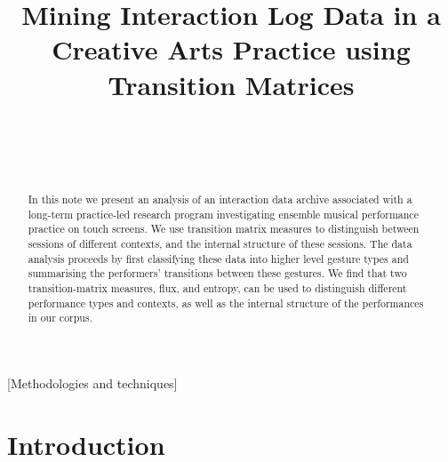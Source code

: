 \documentclass{sigchi}
\begin{document}
 
\title{Mining Interaction Log Data in a Creative Arts Practice using Transition Matrices}

\author{%
  \\
  \\
     \\
}

\maketitle

\begin{abstract}
  In this note we present an analysis of an interaction data archive
  associated with a long-term practice-led research program
  investigating ensemble musical performance practice on touch
  screens. We use transition matrix measures to distinguish between
  sessions of different contexts, and the internal structure of these
  sessions. The data analysis proceeds by first classifying these data
  into higher level gesture types and summarising the performers'
  transitions between these gestures. We find that two
  transition-matrix measures, flux, and entropy, can be used to
  distinguish different performance types and contexts, as well as the
  internal structure of the performances in our corpus.
\end{abstract}


[Methodologies and techniques]

\section{Introduction}
\end{document}
